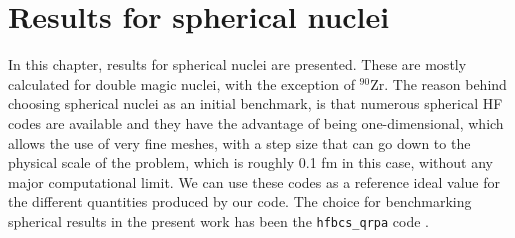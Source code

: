 \chapter{Results for spherical nuclei}
In this chapter, results for spherical nuclei are presented. These are mostly calculated for double magic nuclei, with the exception of $^{90}$Zr.
The reason behind choosing spherical nuclei as an initial benchmark, is that numerous spherical HF codes are available and they have the advantage of being one-dimensional, which allows the use of very fine meshes, with a step size that can go down to the physical scale of the problem, which is roughly 0.1 fm in this case, without any major computational limit. We can use these codes as a reference ideal value for the different quantities produced by our code. The choice for benchmarking spherical results in the present work has been the \texttt{hfbcs\_qrpa} code \cite{hfbcsqrpa}.

